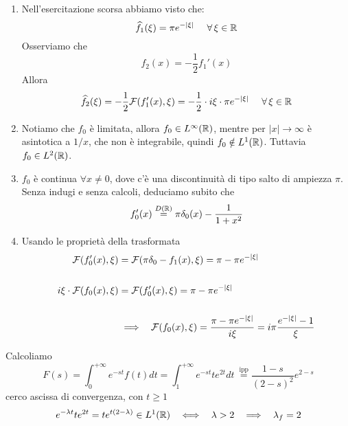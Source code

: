 \begin{enumerate}
\item Nell'esercitazione scorsa abbiamo visto che:
\begin{equation*}
\hat{f}_{1}(\xi) = \pi e^{- | \xi |} \ \ \ \ \forall \xi \in \RR
\end{equation*}Osserviamo che
\begin{equation*}
f_{2}(x) = - \frac{1}{2} f_{1} '(x)
\end{equation*}Allora
\begin{equation*}
\hat{f}_{2}(\xi) = - \frac{1}{2}\Fc (f_{1} '(x), \xi) = - \frac{1}{2} \cdot i\xi \cdot \pi e^{- | \xi |} \ \ \ \ \forall \xi \in \RR
\end{equation*}
\item Notiamo che $f_{0}$ è limitata, allora $f_{0} \in L^{\infty}(\mathbb{R})$, mentre per $| x| \rightarrow \infty $ è asintotica a $1/x$, che non è integrabile, quindi $f_{0} \notin L^{1}(\mathbb{R})$. Tuttavia $f_{0} \in L^{2}(\mathbb{R})$.
\item $f_{0}$ è continua $\forall x\neq 0$, dove c'è una discontinuità di tipo salto di ampiezza $\pi $. Senza indugi e senza calcoli, deduciamo subito che
\begin{equation*}
f_{0} '(x)\overset{D(\mathbb{R})}{=} \pi \delta_{0}(x) - \frac{1}{1 + x^{2}}
\end{equation*}
\item Usando le proprietà della trasformata
\begin{align*}
\mathcal{F} (f_{0} '(x), \xi) & = \mathcal{F} (\pi \delta_{0} - f_{1}(x), \xi) = \pi - \pi e^{- | \xi |}\\
 & \\
i\xi \cdot\mathcal{F} (f_{0}(x), \xi) & = \mathcal{F} (f_{0} '(x), \xi) = \pi - \pi e^{- | \xi |}\\
 & \\
 & \implies \ \ \mathcal{F} (f_{0}(x), \xi) = \frac{\pi - \pi e^{- | \xi |}}{i\xi} = i\pi \frac{e^{- | \xi |} - 1}{\xi}
\end{align*}
\end{enumerate}
\Soluzione

Calcoliamo
\begin{equation*}
F(s) = \int^{+ \infty}_{0} e^{- st} f(t) dt = \int^{+ \infty}_{1} e^{- st} te^{2t} dt\ \overset{\text{ipp}}{=}\frac{1 - s}{(2 - s)^{2}} e^{2 - s}
\end{equation*}
cerco ascissa di convergenza, con $t \geq 1$
\begin{equation*}
e^{- \lambda t} te^{2t} = te^{t(2 - \lambda)} \in L^{1}(\RR) \ \ \iff \ \ \lambda > 2\ \ \implies \ \ \lambda_{f} = 2
\end{equation*}
\Soluzione

